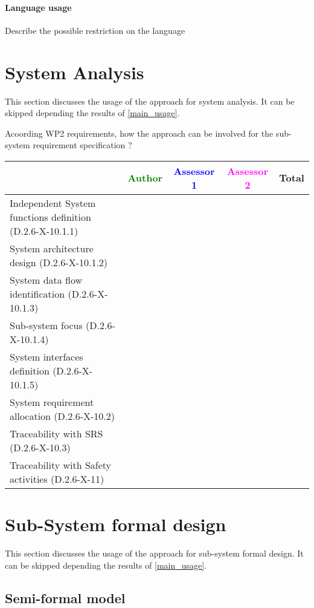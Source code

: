 \paragraph{Language usage} Describe the possible restriction on the language

\section{System Analysis}
This section discusses the usage of the approach for system analysis.
It can be skipped depending the results of \ref{main_usage}.

Acoording WP2 requirements, how the approach can be involved for the sub-system requirement specification ?

\begin{tabular}{|l | c | c | c | c|}
\hline
& \textcolor{green}{Author} & \textcolor{blue}{Assessor 1} & \textcolor{magenta}{Assessor 2} & Total \\
\hline
Independent System functions definition (D.2.6-X-10.1.1)  & & & &  \\
\hline 
System architecture design (D.2.6-X-10.1.2) & & & &  \\
\hline
System data flow identification (D.2.6-X-10.1.3)  & & & &  \\
\hline
Sub-system focus (D.2.6-X-10.1.4)  & & & &  \\
\hline
System interfaces definition (D.2.6-X-10.1.5)  & & & &  \\
\hline
System requirement allocation (D.2.6-X-10.2)  & & & &  \\
\hline
Traceability with SRS (D.2.6-X-10.3)  & & & &  \\
\hline
Traceability with Safety activities (D.2.6-X-11)  & & & &  \\
\hline
\end{tabular}



\section{Sub-System formal design}
This section discusses the usage of the approach for sub-system formal design.
It can be skipped depending the results of \ref{main_usage}.


\subsection{Semi-formal model}

